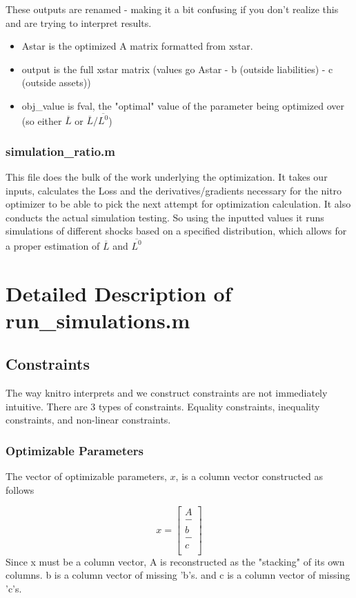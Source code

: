 \documentclass{article}
\newcommand{\?}{\stackrel{?}{=}}
\begin{document}
These outputs are renamed - making it a bit confusing if you don't realize this and are trying to interpret results.
\begin{itemize}
\item Astar is the optimized A matrix formatted from xstar.
\item output is the full xstar matrix (values go Astar - b (outside liabilities) - c (outside assets))
\item obj\_value is fval, the "optimal" value of the parameter being optimized over (so either $\overline{L}$ or $\overline{L}/\overline{L^0}$)
\end{itemize}

\subsubsection{simulation\_ratio.m}
This file does the bulk of the work underlying the optimization. It takes our inputs, calculates the Loss and the derivatives/gradients necessary for the nitro optimizer to be able to pick the next attempt for optimization calculation. It also conducts the actual simulation testing. So using the inputted values it runs simulations of different shocks based on a specified distribution, which allows for a proper estimation of $\overline{L}$ and $\overline{L^0}$

\newpage
\section{Detailed Description of run\_simulations.m}
\subsection{Constraints}
The way knitro interprets and we construct constraints are not immediately intuitive. 
There are 3 types of constraints. Equality constraints, inequality constraints, and non-linear constraints. 
\subsubsection{Optimizable Parameters}
The vector of optimizable parameters, $x$, is a column vector constructed as follows

$$x= 
\begin{bmatrix}
A\\
- \\
b \\
- \\
c \\
\end{bmatrix}
$$
Since x must be a column vector, A is reconstructed as the "stacking" of its own columns. b is a column vector of missing 'b's. and c is a column vector of missing 'c's.
\end{document}
